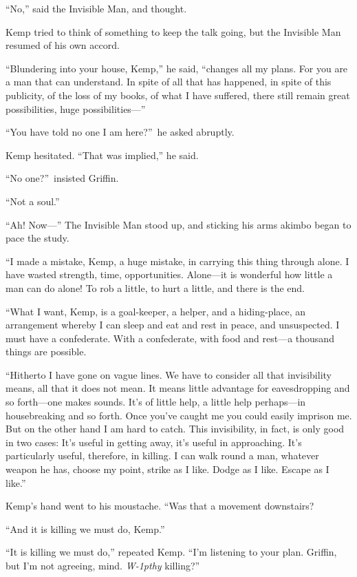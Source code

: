“No,” said the Invisible Man, and thought.

Kemp tried to think of something to keep the talk going, but the Invisible Man resumed of his own accord.

“Blundering into your house, Kemp,” he said, “changes all my plans. For you are a man that can understand. In spite of all that has happened, in spite of this publicity, of the loss of my books, of what I have suffered, there still remain great possibilities, huge possibilities—”

“You have told no one I am here?”\ he asked abruptly.

Kemp hesitated. “That was implied,” he said.

“No one?”\ insisted Griffin.

“Not a soul.”

“Ah! Now—”\intersentencespace{} The Invisible Man stood up, and sticking his arms akimbo began to pace the study.

“I made a mistake, Kemp, a huge mistake, in carrying this thing through alone. I have wasted strength, time, opportunities. Alone—it is wonderful how little a man can do alone! To rob a little, to hurt a little, and there is the end.

“What I want, Kemp, is a goal-keeper, a helper, and a hiding-place, an arrangement whereby I can sleep and eat and rest in peace, and unsuspected. I must have a confederate. With a confederate, with food and rest—a thousand things are possible.

“Hitherto I have gone on vague lines. We have to consider all that invisibility means, all that it does not mean. It means little advantage for eavesdropping and so forth—one makes sounds. It’s of little help, a little help perhaps—in housebreaking and so forth. Once you’ve caught me you could easily imprison me. But on the other hand I am hard to catch. This invisibility, in fact, is only good in two cases: It’s useful in getting away, it’s useful in approaching. It’s particularly useful, therefore, in killing. I can walk round a man, whatever weapon he has, choose my point, strike as I like. Dodge as I like. Escape as I like.”

Kemp’s hand went to his moustache. “Was that a movement downstairs?

“And it is killing we must do, Kemp.”

“It is killing we must do,” repeated Kemp. “I’m listening to your plan. Griffin, but I’m not agreeing, mind. \emph{W\kern-1pthy} killing?”

